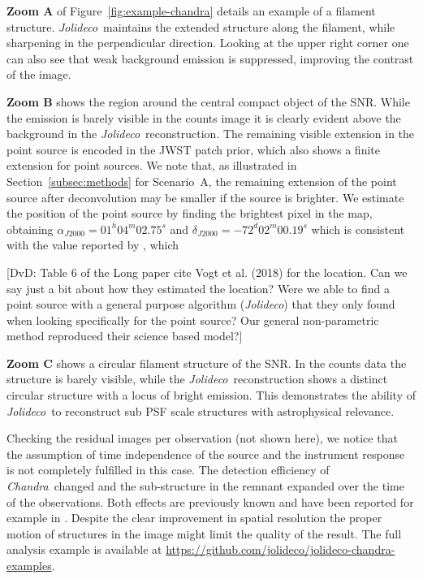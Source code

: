 \documentclass[twocolumn]{aastex631}
\newcommand{\chandra}{\textit{Chandra}~}
\newcommand{\jolideco}{\textit{Jolideco}~}
\newcommand{\jolideconospace}{\textit{Jolideco}}
\newcommand{\dvd}[1]{{\color{red} [DvD: #1]}}
\begin{document}
    \textbf{Zoom A} of Figure~\ref{fig:example-chandra} details an example of a filament structure. \jolideco maintains the extended structure along the filament, while sharpening in the perpendicular direction. Looking at the upper right corner one can also see that weak background emission is suppressed, improving the contrast of the image.
    
    \textbf{Zoom B} shows the region around the central compact object of the SNR. While the emission is barely visible in the counts image it is clearly evident above the background in the \jolideco reconstruction. The remaining visible extension in the point source is encoded in the JWST patch prior, which also shows a finite extension for point sources. We note that, as illustrated in Section~\ref{subsec:methods} for Scenario~A, the remaining extension of the point source after deconvolution may be smaller if the source is brighter. We estimate the position of the point source by finding the brightest pixel in the map, obtaining $\alpha_{J2000}=01^h04^m02.75^s$ and $\delta_{J2000}=-72^d02^m00.19^s$ which is consistent with the value reported by \cite{Long2020}, which 
    
    \dvd{Table 6 of the Long paper cite Vogt et al. (2018) for the location. Can we say just a bit about how they estimated the location? Were we able to find a point source with a general purpose algorithm (\jolideconospace) that they only found when looking specifically for the point source? Our general non-parametric method reproduced their science based model?}
    
    \textbf{Zoom C} shows a circular filament structure of the SNR. In the counts data the structure is barely visible, while the \jolideco reconstruction shows a distinct circular structure with a locus of bright emission. This demonstrates the ability of \jolideco to reconstruct sub PSF scale structures with astrophysical relevance.

    Checking the residual images per observation (not shown here), we notice that the assumption of time independence of the source and the instrument response is not completely fulfilled in this case. The detection efficiency of \chandra changed and the sub-structure in the remnant expanded over the time of the observations. Both effects are previously known and have been reported for example in \cite{Xi2019}. Despite the clear improvement in spatial resolution the proper motion of structures in the image might limit the quality of the result. The full analysis example is available at \url{https://github.com/jolideco/jolideco-chandra-examples}.
\end{document}
